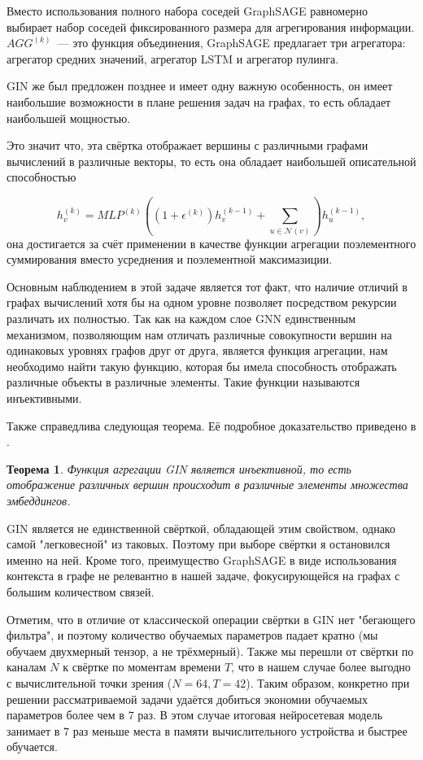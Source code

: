 \documentclass[12pt]{article}
\newtheorem{Th}{Теорема}
\begin{document}
Вместо использования полного набора соседей GraphSAGE равномерно выбирает набор соседей фиксированного размера для агрегирования информации. $AGG^{(k)}$~--- это функция объединения, GraphSAGE предлагает три агрегатора: агрегатор средних значений, агрегатор LSTM и агрегатор пулинга.

GIN же был предложен позднее и имеет одну важную особенность, он имеет наибольшие возможности в плане решения задач на графах, то есть обладает наибольшей мощностью. 

Это значит что, эта свёртка отображает вершины с различными графами вычислений в различные векторы, то есть она обладает наибольшей описательной способностью

$$
h_{v}^{(k)} = MLP^{(k)}((1 + \epsilon^{(k)})h_{v}^{(k-1)} + \sum_{u \in \mathcal{N}(v)})h_{u}^{(k-1)},
$$
она достигается за счёт применении в качестве функции агрегации поэлементного суммирования вместо усреднения и поэлементной максимазиции.

Основным наблюдением в этой задаче является тот факт, что наличие отличий в графах вычислений хотя бы на одном уровне позволяет посредством рекурсии различать их полностью. Так как на каждом слое GNN единственным механизмом, позволяющим нам отличать различные совокупности вершин на одинаковых уровнях графов друг от друга, является функция агрегации, нам необходимо найти такую функцию, которая бы имела способность отображать различные объекты в различные элементы. Такие функции называются инъективными.

Также справедлива следующая теорема. Её подробное доказательство приведено в \cite{xu2018powerful}.

\begin{Th}
Функция агрегации GIN является инъективной, то есть отображение различных вершин происходит в различные элементы множества эмбеддингов.
\end{Th}

GIN является не единственной свёрткой, обладающей этим свойством, однако самой "легковесной" из таковых. Поэтому при выборе свёртки я остановился именно на ней. Кроме того, преимущество GraphSAGE в виде использования контекста в графе не релевантно в нашей задаче, фокусирующейся на графах с большим количеством связей.

Отметим, что в отличие от классической операции свёртки в GIN нет "бегающего фильтра", и поэтому количество обучаемых параметров падает кратно (мы обучаем двухмерный тензор, а не трёхмерный). Также мы перешли от свёртки по каналам $N$ к свёртке по моментам времени $T$, что в нашем случае более выгодно с вычислительной точки зрения ($N = 64, T = 42$). Таким образом, конкретно при решении рассматриваемой задачи удаётся добиться экономии обучаемых параметров более чем в $7$ раз. В этом случае итоговая нейросетевая модель занимает в $7$ раз меньше места в памяти вычислительного устройства и быстрее обучается.
\end{document}
